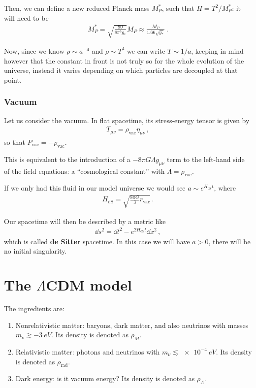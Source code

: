 \documentclass[main.tex]{subfiles}
\begin{document}
Then, we can define a new reduced Planck mass \(M_P^{*}\), such that \(H = T^2 / M_P^{*}\): it will need to be 
%
\begin{align}
M_{P}^{*} = \sqrt{\frac{90}{8 \pi^3 g_{*}}} M_P \approx \frac{M_P}{\num{1.66}\sqrt{g_*}}
\,.
\end{align}

Now, since we know \(\rho \sim a^{-4}\) and \(\rho \sim T^{4}\) we can write \(T \sim 1/ a\), keeping in mind however that the constant in front is not truly so for the whole evolution of the universe, instead it varies depending on which particles are decoupled at that point. 

\subsubsection{Vacuum}

Let us consider the vacuum. In flat spacetime, its stress-energy tensor is given by 
%
\begin{align}
T_{\mu \nu } = \rho _{\text{vac}} \eta_{\mu \nu }
\,,
\end{align}
%
so that \(P _{\text{vac}} = - \rho _{\text{vac}}\).

This is equivalent to the introduction of a \(- 8 \pi G \Lambda g_{\mu \nu }\) term to the left-hand side of the field equations: a ``cosmological constant'' with \(\Lambda = \rho _{\text{vac}}\).

If we only had this fluid in our model universe we would see \(a \sim e^{H _{\text{dS}}t}\), where 
%
\begin{align}
H _{\text{dS}} = \sqrt{\frac{8 \pi G}{3} r _{\text{vac}}}
\,.
\end{align}

Our spacetime will then be described by a metric like 
%
\begin{align}
\dd{s^2} = \dd{t^2} - e^{2H _{\text{dS}}t } \dd{x}^2
\,,
\end{align}
%
which is called \textbf{de Sitter} spacetime.
In this case we will have \(\ddot{a} > 0\), there will be no initial singularity.

\section{The \(\Lambda \)CDM model}

The ingredients are: 
\begin{enumerate}
    \item Nonrelativistic matter: baryons, dark matter, and also neutrinos with masses \(m_{\nu } \gtrsim \SI{-3}{eV}\). Its density is denoted as \(\rho_{M}\).
    \item Relativistic matter: photons and neutrinos with \(m_\nu \lesssim \SI{e-4}{eV}\). Its density is denoted as \(\rho _{\text{rad}}\).
    \item Dark energy: is it vacuum energy? Its density is denoted as \(\rho_{\Lambda }\).
\end{enumerate}
\end{document}

